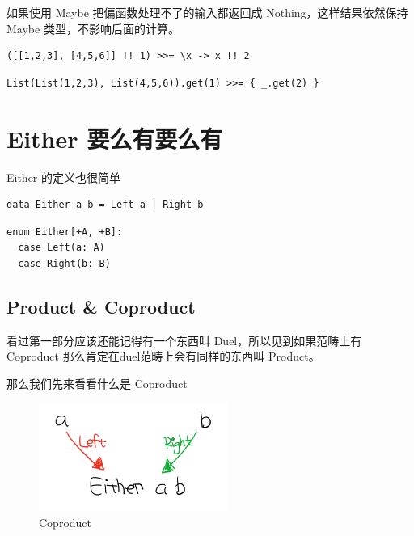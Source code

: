 \documentclass[letterspacing]{tufte-book}
\begin{document}
如果使用 Maybe 把偏函数处理不了的输入都返回成 Nothing，这样结果依然保持 Maybe 类型，不影响后面的计算。

\lstset{language=haskell,label= ,caption= ,captionpos=b,numbers=none}
\begin{lstlisting}
([[1,2,3], [4,5,6]] !! 1) >>= \x -> x !! 2
\end{lstlisting}

\lstset{language=scala,label= ,caption= ,captionpos=b,numbers=none}
\begin{lstlisting}
List(List(1,2,3), List(4,5,6)).get(1) >>= { _.get(2) }
\end{lstlisting}

\chapter{Either 要么有要么有}
\label{sec:org542b817}

Either 的定义也很简单
\lstset{language=haskell,label= ,caption= ,captionpos=b,numbers=none}
\begin{lstlisting}
data Either a b = Left a | Right b
\end{lstlisting}

\lstset{language=scala,label= ,caption= ,captionpos=b,numbers=none}
\begin{lstlisting}
enum Either[+A, +B]:
  case Left(a: A)
  case Right(b: B)
\end{lstlisting}


\section{Product \& Coproduct}
\label{sec:orgb971bb5}
看过第一部分应该还能记得有一个东西叫 Duel，所以见到如果范畴上有 Coproduct 那么肯定在duel范畴上会有同样的东西叫 Product。

那么我们先来看看什么是 Coproduct

\begin{figure}[htbp]
\centering
\includegraphics[width=.9\linewidth]{images/p2-coproduct.png}
\caption{Coproduct}
\end{figure}
\end{document}
